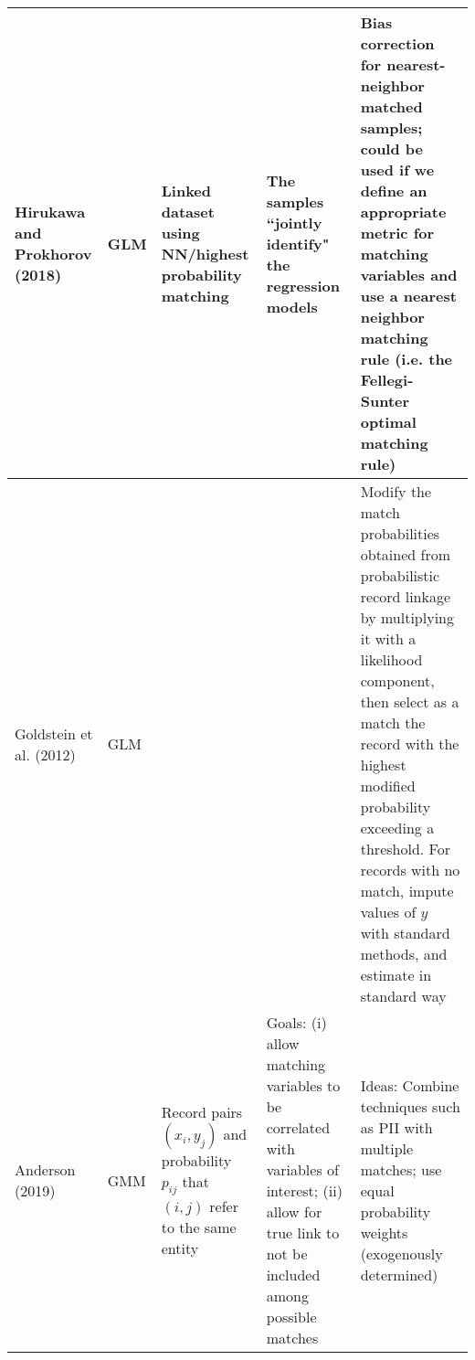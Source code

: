 \documentclass[border=10pt]{standalone}
\begin{document}
\begin{tabular}{L{3.5cm}C{3cm}L{4cm}L{8cm}L{12cm}}
\midrule 
Hirukawa and Prokhorov (2018) & GLM & Linked dataset using NN/highest probability matching & The samples ``jointly identify" the regression models & Bias correction for nearest-neighbor matched samples; could be used if we define an appropriate metric for matching variables and use a nearest neighbor matching rule (i.e. the Fellegi-Sunter optimal matching rule)\\
\midrule
Goldstein et al. (2012) & GLM &  &  & Modify the match probabilities obtained from probabilistic record linkage by multiplying it with a likelihood component, then select as a match the record with the highest modified probability exceeding a threshold.  For records with no match, impute values of $y$ with standard methods, and estimate in standard way \\

\midrule
Anderson (2019) & GMM & Record pairs $(x_i, y_j)$ and probability $p_{ij}$ that $(i,j)$ refer to the same entity & Goals: (i) allow matching variables to be correlated with variables of interest; (ii) allow for true link to not be included among possible matches & Ideas: Combine techniques such as PII with multiple matches; use equal probability weights (exogenously determined)  
 \end{tabular}
 
\end{document}
